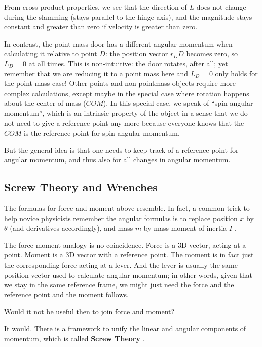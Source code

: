 From cross product properties, we see that the direction of \(L\) does not change during the slamming (stays parallel to the hinge axis), and the magnitude stays constant and greater than zero if velocity is greater than zero.

In contrast, the point mass door has a different angular momentum when calculating it relative to point \(D\): the position vector \(r_DD\) becomes zero, so \(L_{D} = 0\) at all times.
This is non-intuitive: the door rotates, after all; yet remember that we are reducing it to a point mass here and \(L_{D} = 0\) only holds for the point mass case!
Other points and non-pointmass-objects require more complex calculations, except maybe in the special case where rotation happens about the center of mass (\(COM\)).
In this special case, we speak of ``spin angular momentum'', which is an intrinsic property of the object in a sense that we do not need to give a reference point any more because everyone knows that the \(COM\) is the reference point for spin angular momentum.


But the general idea is that one needs to keep track of a reference point for angular momentum, and thus also for all changes in angular momentum.


\subsection{Screw Theory and Wrenches}
\label{sec:org6da7e52}

The formulas for force and moment above resemble.
In fact, a common trick to help novice physicists remember the angular formulas is to replace position \(x\) by \(\theta\) (and derivatives accordingly), and mass \(m\) by mass moment of inertia \(I\) \citep{Tipler2007}.

The force-moment-analogy is no coincidence.
Force is a 3D vector, acting at a point.
Moment is a 3D vector with a reference point.
The moment is in fact just the corresponding force acting at a lever.
And the lever is usually the same position vector used to calculate angular momentum; in other words, given that we stay in the same reference frame, we might just need the force and the reference point and the moment follows.

Would it not be useful then to join force and moment?


It would.
There is a framework to unify the linear and angular components of momentum, which is called \textbf{Screw Theory} \citep{Ball1876,Lynch2017}.

